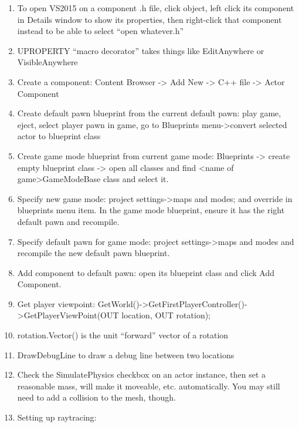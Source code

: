 \documentclass[letter,12pt]{article}
\begin{document}
\begin{enumerate}
\item To open VS2015 on a component .h file, click object, left click its component in Details window to show its properties, then right-click that component instead to be able to select “open whatever.h”

\item UPROPERTY “macro decorator” takes things like EditAnywhere or VisibleAnywhere

\item Create a component: Content Browser -> Add New -> C++ file -> Actor Component

\item Create default pawn blueprint from the current default pawn: play game, eject, select player pawn in game,
go to Blueprints menu->convert selected actor to blueprint class

\item Create game mode blueprint from current game mode: Blueprints -> create empty blueprint class -> open all classes and find <name of game>GameModeBase class and select it.

\item Specify new game mode: project settings->maps and modes; and override in blueprints menu item.  In the game mode blueprint, ensure it has the right default pawn and recompile.

\item Specify default pawn for game mode: project settings->maps and modes and recompile the new default pawn blueprint.

\item Add component to default pawn: open its blueprint class and click Add Component.

\item Get player viewpoint: GetWorld()->GetFirstPlayerController()->GetPlayerViewPoint(OUT location, OUT rotation);

\item rotation.Vector() is the unit “forward” vector of a rotation

\item DrawDebugLine to draw a debug line between two locations

\item Check the SimulatePhysics checkbox on an actor instance, then set a reasonable mass, will make it moveable, etc. automatically.  You may still need to add a  collision to the mesh, though.

\item Setting up raytracing:


\end{enumerate}
\end{document}
